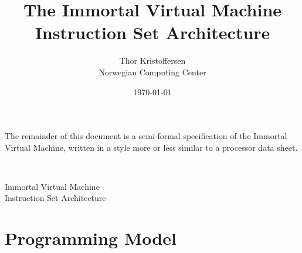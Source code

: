 \documentclass[a4paper,10pt]{article}
\author{Thor Kristoffersen\\Norwegian Computing Center}
\date{\today}
\title{The Immortal Virtual Machine\\Instruction Set Architecture}
\theoremstyle{definition}
\begin{document}
\maketitle

\noindent
The remainder of this document is a semi-formal specification of the Immortal Virtual Machine, written in a style more or less similar to a processor data sheet.

\thispagestyle{empty}
\newpage

~
\thispagestyle{empty}
\newpage
\setcounter{page}{1}

\begin{center}
  \Large{Immortal Virtual Machine\\Instruction Set Architecture}
\end{center}
\vspace{1em}

\section{Programming Model}
\label{sec:programming-model}
\end{document}

